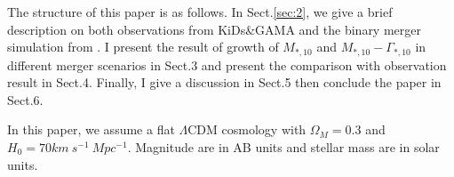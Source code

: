 \documentclass[fleqn,usenatbib]{mnras}
\begin{document}
\par The structure of this paper is as follows. In Sect.\ref{sec:2}, we give a brief description on both observations from KiDs\&GAMA and the binary merger simulation from \citep{nipoti2009}. I present the result of growth of $M_{*,10}$ and $M_{*,10}-\Gamma_{*,10}$ in different merger scenarios in Sect.3  and present the comparison with observation result in Sect.4. Finally, I give a discussion in Sect.5 then conclude the paper in Sect.6.
\par In this paper, we assume a flat $\Lambda$CDM cosmology with $\Omega_M = 0.3$ and $H_0 = 70 km ~s^{-1}~Mpc^{-1}$. Magnitude are in AB units and stellar mass are in solar units.
\end{document}

